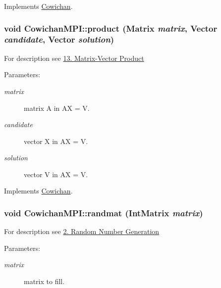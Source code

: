 Implements \hyperlink{class_cowichan_52f17221019290b88334b0ca7f3bcdb9}{Cowichan}.\hypertarget{class_cowichan_m_p_i_1b7dccf774caccb26839cd29fe0a5cb0}{
\subsubsection[{product}]{\setlength{\rightskip}{0pt plus 5cm}void CowichanMPI::product ({\bf Matrix} {\em matrix}, \/  {\bf Vector} {\em candidate}, \/  {\bf Vector} {\em solution})}}
\label{class_cowichan_m_p_i_1b7dccf774caccb26839cd29fe0a5cb0}


For description see \hyperlink{index_product_sec}{13. Matrix-Vector Product} \begin{Desc}
\item[Parameters:]
\begin{description}
\item[{\em matrix}]matrix A in AX = V. \item[{\em candidate}]vector X in AX = V. \item[{\em solution}]vector V in AX = V. \end{description}
\end{Desc}


Implements \hyperlink{class_cowichan_3d7d4b581a1d6f0392dc452830fb3b03}{Cowichan}.\hypertarget{class_cowichan_m_p_i_6805f21144aeaeddc4549e1b2b42bca8}{
\subsubsection[{randmat}]{\setlength{\rightskip}{0pt plus 5cm}void CowichanMPI::randmat ({\bf IntMatrix} {\em matrix})}}
\label{class_cowichan_m_p_i_6805f21144aeaeddc4549e1b2b42bca8}


For description see \hyperlink{index_randmat_sec}{2. Random Number Generation} \begin{Desc}
\item[Parameters:]
\begin{description}
\item[{\em matrix}]matrix to fill. \end{description}
\end{Desc}


